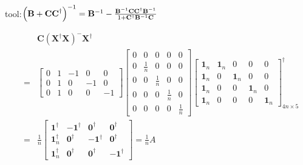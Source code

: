 \documentclass{article}
\begin{document}
tool:$\left( \mathbf{B+CC}^{\dagger }\right) ^{-1}=\mathbf{B}^{-1}-\frac{%
\mathbf{B}^{-1}\mathbf{CC}^{\dagger }\mathbf{B}^{-1}}{1+\mathbf{C}^{\dagger }%
\mathbf{B}^{-1}\mathbf{C}}$

\begin{eqnarray*}
&&\mathbf{C}\left( \mathbf{X}^{\dagger }\mathbf{X}\right) ^{-}\mathbf{X}%
^{\dagger } \\
&=&\left[ 
\begin{array}{ccccc}
0 & 1 & -1 & 0 & 0 \\ 
0 & 1 & 0 & -1 & 0 \\ 
0 & 1 & 0 & 0 & -1%
\end{array}%
\right] \left[ 
\begin{array}{ccccc}
0 & 0 & 0 & 0 & 0 \\ 
0 & \frac{1}{n} & 0 & 0 & 0 \\ 
0 & 0 & \frac{1}{n} & 0 & 0 \\ 
0 & 0 & 0 & \frac{1}{n} & 0 \\ 
0 & 0 & 0 & 0 & \frac{1}{n}%
\end{array}%
\right] \left[ 
\begin{array}{ccccc}
\mathbf{1}_{n} & \mathbf{1}_{n} & 0 & 0 & 0 \\ 
\mathbf{1}_{n} & 0 & \mathbf{1}_{n} & 0 & 0 \\ 
\mathbf{1}_{n} & 0 & 0 & \mathbf{1}_{n} & 0 \\ 
\mathbf{1}_{n} & 0 & 0 & 0 & \mathbf{1}_{n}%
\end{array}%
\right] _{4n\times 5}^{\dagger } \\
&=&\frac{1}{n}\left[ 
\begin{array}{cccc}
\mathbf{1}^{\dagger } & -\mathbf{1}^{\dagger } & \mathbf{0}^{\dagger } & 
\mathbf{0}^{\dagger } \\ 
\mathbf{1}_{n}^{\dagger } & \mathbf{0}^{\dagger } & -\mathbf{1}^{\dagger } & 
\mathbf{0}^{\dagger } \\ 
\mathbf{1}_{n}^{\dagger } & \mathbf{0}^{\dagger } & \mathbf{0}^{\dagger } & -%
\mathbf{1}^{\dagger }%
\end{array}%
\right] =\frac{1}{n}A
\end{eqnarray*}%
\end{document}
